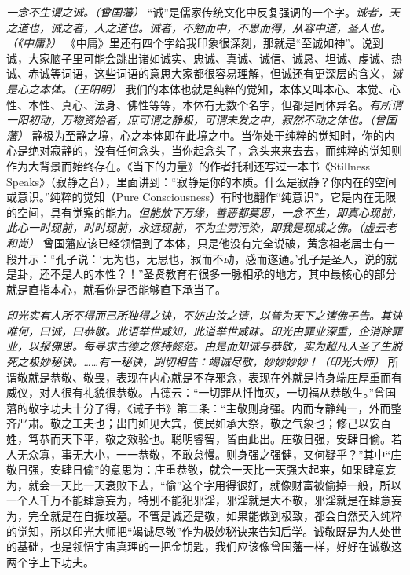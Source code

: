\textit{一念不生谓之诚。（曾国藩）} “诚”是儒家传统文化中反复强调的一个字。\textit{诚者，天之道也，诚之者，人之道也。诚者，不勉而中，不思而得，从容中道，圣人也。（《中庸》）} 《中庸》里还有四个字给我印象很深刻，那就是“至诚如神”。说到诚，大家脑子里可能会跳出诸如诚实、忠诚、真诚、诚信、诚恳、坦诚、虔诚、热诚、赤诚等词语，这些词语的意思大家都很容易理解，但诚还有更深层的含义，\textit{诚是心之本体。（王阳明）} 我们的本体也就是纯粹的觉知，本体又叫本心、本觉、心性、本性、真心、法身、佛性等等，本体有无数个名字，但都是同体异名。\textit{有所谓一阳初动，万物资始者，庶可谓之静极，可谓未发之中，寂然不动之体也。（曾国藩）} 静极为至静之境，心之本体即在此境之中。当你处于纯粹的觉知时，你的内心是绝对寂静的，没有任何念头，当你起念头了，念头来来去去，而纯粹的觉知则作为大背景而始终存在。《当下的力量》的作者托利还写过一本书《Stillness Speaks》（寂静之音），里面讲到：“寂静是你的本质。什么是寂静？你内在的空间或意识。”纯粹的觉知（Pure Consciousness）有时也翻作“纯意识”，它是内在无限的空间，具有觉察的能力。\textit{但能放下万缘，善恶都莫思，一念不生，即真心现前，此心一时现前，时时现前，永远现前，不为尘劳污染，即我是现成之佛。（虚云老和尚）} 曾国藩应该已经领悟到了本体，只是他没有完全说破，黄念祖老居士有一段开示：“孔子说：‘无为也，无思也，寂而不动，感而遂通。’孔子是圣人，说的就是卦，还不是人的本性？！”圣贤教育有很多一脉相承的地方，其中最核心的部分就是直指本心，就看你是否能够直下承当了。

\textit{印光实有人所不得而己所独得之诀，不妨由汝之请，以普为天下之诸佛子告。其诀唯何，曰诚，曰恭敬。此语举世咸知，此道举世咸昧。印光由罪业深重，企消除罪业，以报佛恩。每寻求古德之修持懿范。由是而知诚与恭敬，实为超凡入圣了生脱死之极妙秘诀。……有一秘诀，剀切相告：竭诚尽敬，妙妙妙妙！（印光大师）} 所谓敬就是恭敬、敬畏，表现在内心就是不存邪念，表现在外就是持身端庄厚重而有威仪，对人很有礼貌很恭敬。古德云：“一切罪从忏悔灭，一切福从恭敬生。”曾国藩的敬字功夫十分了得，《诫子书》第二条：“主敬则身强。内而专静纯一，外而整齐严肃。敬之工夫也；出门如见大宾，使民如承大祭，敬之气象也；修己以安百姓，笃恭而天下平，敬之效验也。聪明睿智，皆由此出。庄敬日强，安肆日偷。若人无众寡，事无大小，一一恭敬，不敢怠慢。则身强之强健，又何疑乎？”其中“庄敬日强，安肆日偷”的意思为：庄重恭敬，就会一天比一天强大起来，如果肆意妄为，就会一天比一天衰败下去，“偷”这个字用得很好，就像财富被偷掉一般，所以一个人千万不能肆意妄为，特别不能犯邪淫，邪淫就是大不敬，邪淫就是在肆意妄为，完全就是在自掘坟墓。不管是诚还是敬，如果能做到极致，都会自然契入纯粹的觉知，所以印光大师把“竭诚尽敬”作为极妙秘诀来告知后学。诚敬既是为人处世的基础，也是领悟宇宙真理的一把金钥匙，我们应该像曾国藩一样，好好在诚敬这两个字上下功夫。

